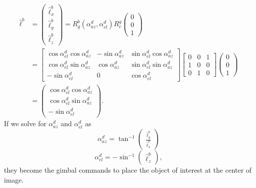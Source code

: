 \begin{align}
\hat{\ell}^b&=\begin{pmatrix}
\hat{\ell}_x^b \\
\hat{\ell}_y^b \\
\hat{\ell}_z^b
\end{pmatrix}=R_{g}^b(\alpha_{az}^d, \alpha_{el}^d) R_{c}^g\begin{pmatrix}
0 \\ 0 \\ 1
\end{pmatrix}
\\&=\begin{bmatrix}
\cos\alpha_{el}^d\cos\alpha_{az}^d & -\sin\alpha_{az}^d & \sin\alpha_{el}^d\cos\alpha_{az}^d \\
\cos\alpha_{el}^d\sin\alpha_{az}^d & \cos\alpha_{az}^d & \sin\alpha_{el}^d\sin\alpha_{az}^d \\
-\sin\alpha_{el}^d & 0 & \cos\alpha_{el}^d
\end{bmatrix}
\begin{bmatrix}
0 & 0 & 1 \\
1 & 0 & 0 \\
0 & 1 & 0
\end{bmatrix}
\begin{pmatrix}
0 \\ 0 \\ 1
\end{pmatrix}
\\&=\begin{pmatrix}
\cos\alpha_{el}^d\cos\alpha_{az}^d \\
\cos\alpha_{el}^d\sin\alpha_{az}^d \\
-\sin\alpha_{el}^d
\end{pmatrix}.
\end{align}
If we solve for $\alpha_{az}^d$ and $\alpha_{el}^d$ as 
\begin{equation}
\alpha_{az}^d=\tan^{-1}
\begin{pmatrix}
\frac{\hat{\ell}_y^b}{\hat{\ell}_x^b}
\end{pmatrix}
\end{equation}
\begin{equation}
\alpha_{el}^d=-\sin^{-1}
\begin{pmatrix}
\hat{\ell}_z^b
\end{pmatrix},
\end{equation}
they become the gimbal commands to place the object of interest at the center of image.


